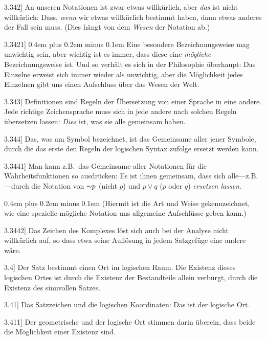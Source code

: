 \documentclass[12pt,oneside]{book}[2007/10/19]
\newcommand{\PropERef}[1]{\hyperref[PropE:#1]{#1}}
\newcommand{\PropositionG}[2]{%
  \item[\phantomsection\label{PropG:#1}\PropERef{#1}] #2%
}
\newcommand{\Not}[1]{\mathord{\thicksim} #1}
\newcommand{\Emph}[1]{\emph{#1}}%
\newcommand{\zumBeispiel}{z.\;B.}
\newcommand{\stretchyspace}{\spaceskip0.4em plus 0.2em minus 0.1em}
\begin{document}
\begin{propositions}
\PropositionG{3.342}
{An unseren Notationen ist zwar etwas willkürlich,
aber \Emph{das} ist nicht willkürlich: Dass, \Emph{wenn} wir
etwas willkürlich bestimmt haben, dann etwas
anderes der Fall sein muss. (Dies hängt von dem
\Emph{Wesen} der Notation ab.)}


\PropositionG{3.3421}
{{\stretchyspace
Eine besondere Bezeichnungsweise mag unwichtig
sein, aber wichtig ist es immer, dass diese
eine \Emph{mögliche} Bezeichnungsweise ist. Und so
verhält es sich in der Philosophie überhaupt: Das
Einzelne erweist sich immer wieder als unwichtig,
aber die Möglichkeit jedes Einzelnen gibt uns
einen Aufschluss über das Wesen der Welt.}}


\PropositionG{3.343}
{Definitionen sind Regeln der Übersetzung von
einer Sprache in eine andere. Jede richtige Zeichensprache
muss sich in jede andere nach solchen
Regeln übersetzen lassen: \Emph{Dies} ist, was sie alle
gemeinsam haben.}


\PropositionG{3.344}
{Das, was am Symbol bezeichnet, ist das Gemeinsame
aller jener Symbole, durch die das erste den
Regeln der logischen Syntax zufolge ersetzt werden
kann.}


\PropositionG{3.3441}
{Man kann \zumBeispiel\ das Gemeinsame aller Notationen
für die Wahrheitsfunktionen so ausdrücken: Es ist
ihnen gemeinsam, dass sich alle---\zumBeispiel---durch die
Notation von \glqq{}$\Not{p}$\grqq{} (\glqq{}nicht $p$\grqq{}) und \glqq{}$p \lor q$\grqq{} (\glqq{}$p$ oder $q$\grqq{})
\Emph{ersetzen lassen}.

{\stretchyspace
(Hiermit ist die Art und Weise gekennzeichnet,
wie eine spezielle mögliche Notation uns allgemeine
Aufschlüsse geben kann.)}}


\PropositionG{3.3442}
{Das Zeichen des Komplexes löst sich auch bei
der Analyse nicht willkürlich auf, so dass etwa seine
Auflösung in jedem Satzgefüge eine andere wäre.}


\PropositionG{3.4}
{Der Satz bestimmt einen Ort im logischen Raum.
Die Existenz dieses logischen Ortes ist durch die
Existenz der Bestandteile allein verbürgt, durch die
Existenz des sinnvollen Satzes.}


\PropositionG{3.41}
{Das Satzzeichen und die logischen Koordinaten:
\enlargethispage{1pt} %
Das ist der logische Ort.}


\PropositionG{3.411}
{Der geometrische und der logische Ort stimmen
darin überein, dass beide die Möglichkeit einer
Existenz sind.}



\end{propositions}
\end{document}
